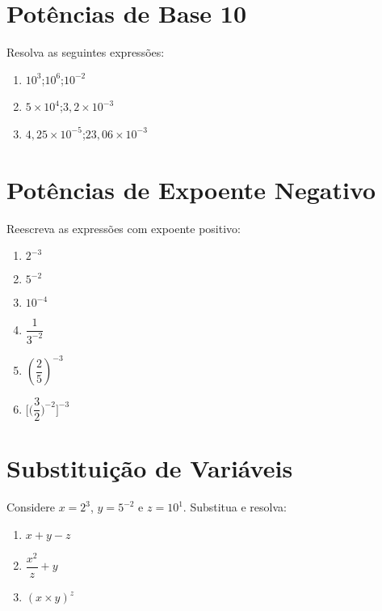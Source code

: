 \documentclass[a4paper,12pt]{article}
\begin{document}
\begin{multicols}{2}
		\section*{Potências de Base 10}
		Resolva as seguintes expressões:
		\begin{enumerate}
			\item $10^3$;\quad $10^6$;\quad $10^{-2}$
			\item $5 \times 10^4$;\quad $3,2 \times 10^{-3}$
			\item $4,25 \times 10^{-5}$;\quad $23,06 \times 10^{-3}$
		\end{enumerate}
		
		\section*{Potências de Expoente Negativo}
		Reescreva as expressões com expoente positivo:
		\begin{multicols}{2}
		\begin{enumerate}
			\item $2^{-3}$
			\item $5^{-2}$
			\item $10^{-4}$
			\item $\dfrac{1}{3^{-2}}$
			\item $\left(\dfrac{2}{5}\right)^{-3}$
			\item $ \Bigg[ \bigg( \dfrac{3}{2} \bigg)^{-2} \Bigg] ^{-3}$
		\end{enumerate}
		\end{multicols}
		
		\section*{Substituição de Variáveis}
		Considere $x = 2^3$, $y = 5^{-2}$ e $z = 10^1$. Substitua e resolva:
		\begin{enumerate}
			\item $x + y - z$
			\item $\dfrac{x^2}{z} + y$
			\item $(x \times y)^z$
		\end{enumerate}
		

\end{multicols}
\end{document}
